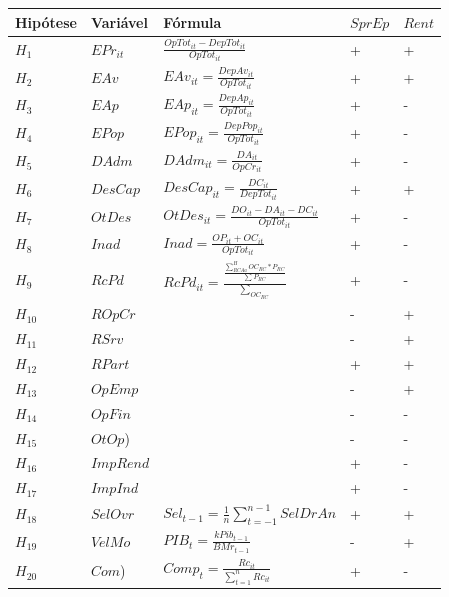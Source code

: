 \documentclass[
  12pt,
  12pt,
  openright,
  oneside,
  a4paper,
  chapter=TITLE,
  section=TITLE,
  subsection=TITLE,
  subsubsection=TITLE,
  english,
  portugues,
  sumario=tradicional]{abntex2}
\begin{document}
\begin{longtable}[]{@{}
  >{\centering\arraybackslash}p{}
  >{\centering\arraybackslash}p{}
  >{\centering\arraybackslash}p{}
  >{\centering\arraybackslash}p{}
  >{\centering\arraybackslash}p{}@{}}
\toprule
Hipótese & Variável & Fórmula & \(SprEp\) & \(Rent\) \\
\midrule
\endhead
\(H_{1}\) & \(EPr_{it}\) & \(\frac{OpTot_{it} - DepTot_{it}}{OpTot_{it}}\) & + & + \\
\(H_{2}\) & \(EAv\) & \(EAv_{it} = \frac{DepAv_{it}}{OpTot_{it}}\) & + & + \\
\(H_{3}\) & \(EAp\) & \(EAp_{it} = \frac{DepAp_{it}}{OpTot_{it}}\) & + & - \\
\(H_{4}\) & \(EPop\) & \(EPop_{it} = \frac{DepPop_{it}}{OpTot_{it}}\) & + & - \\
\(H_{5}\) & \(DAdm\) & \(DAdm_{it} = \frac{DA_{it}}{OpCr_{it}}\) & + & - \\
\(H_{6}\) & \(DesCap\) & \(DesCap_{it} = \frac{DC_{it}}{DepTot_{it}}\) & + & + \\
\(H_{7}\) & \(OtDes\) & \(OtDes_{it} = \frac{ DO_{it} - DA_{it} - DC_{it} }{ OpTot_{it} }\) & + & - \\
\(H_{8}\) & \(Inad\) & \(Inad = \frac{ OP_{it} + OC_{it} }{OpTot_{it}}\) & + & - \\
\(H_{9}\) & \(RcPd\) & \(RcPd_{it} = \frac{\frac{\sum_{RCAa}^HOC_{RC}*P_{RC}}{\sum_{}P_{RC}}}{\sum_{OC_{RC}}}\) & + & - \\
\(H_{10}\) & \(ROpCr\) & & - & + \\
\(H_{11}\) & \(RSrv\) & & - & + \\
\(H_{12}\) & \(RPart\) & & + & + \\
\(H_{13}\) & \(OpEmp\) & & - & + \\
\(H_{14}\) & \(OpFin\) & & - & - \\
\(H_{15}\) & \(OtOp\)) & & - & - \\
\(H_{16}\) & \(ImpRend\) & & + & - \\
\(H_{17}\) & \(ImpInd\) & & + & - \\
\(H_{18}\) & \(SelOvr\) & \(Sel_{t-1} = \frac{1}{n}\sum_{t=-1}^{n-1}SelDrAn\) & + & + \\
\(H_{19}\) & \(VelMo\) & \(PIB_{t} = \frac{k Pib_{t-1}}{BMr_{t-1}}\) & - & + \\
\(H_{20}\) & \(Com\)) & \(Comp_{t} = \frac{Rc_{it}}{\sum_{t=1}^{n}Rc_{it}}\) & + & - \\

\end{longtable}
\end{document}
